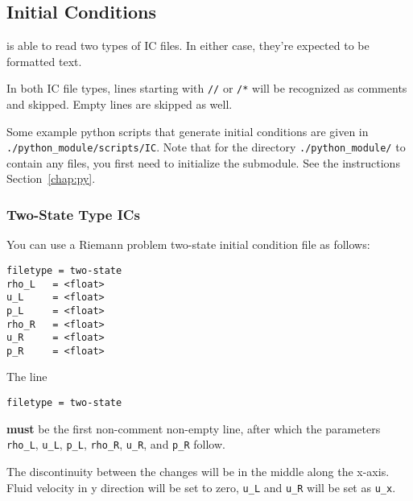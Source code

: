 \subsection{Initial Conditions}\label{chap:icfile}



\hydro is able to read two types of IC files. In either case, they're expected
to be formatted text.

In both IC file types, lines starting with \texttt{//} or \texttt{/*} will be
recognized as comments and skipped. Empty lines are skipped as well.

Some example python scripts that generate initial conditions are given in
\verb|./python_module/scripts/IC|. Note that for the directory
\verb|./python_module/| to contain any files, you first need to initialize the
submodule. See the instructions Section~\ref{chap:py}.







\subsubsection{Two-State Type ICs}\label{chap:twostate-ic}

You can use a Riemann problem two-state initial condition file as follows:

\begin{lstlisting}
filetype = two-state
rho_L   = <float>
u_L     = <float>
p_L     = <float>
rho_R   = <float>
u_R     = <float>
p_R     = <float>
\end{lstlisting}

The line

\begin{lstlisting}
filetype = two-state
\end{lstlisting}

\textbf{must} be the first non-comment non-empty line, after which the
parameters \texttt{rho\_L}, \texttt{u\_L}, \texttt{p\_L}, \texttt{rho\_R},
\texttt{u\_R}, and \texttt{p\_R} follow.

The discontinuity between the changes will be in the middle along the x-axis.
Fluid velocity in y direction will be set to zero, \texttt{u\_L} and
\texttt{u\_R} will be set as \texttt{u\_x}.









